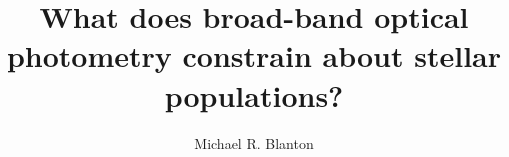 \documentclass[10pt]{aastex}
\begin{document}
\title{What does broad-band optical photometry constrain about stellar
  populations?}

\author{
Michael R. Blanton\altaffilmark{\ref{NYU}}
}
\end{document}
